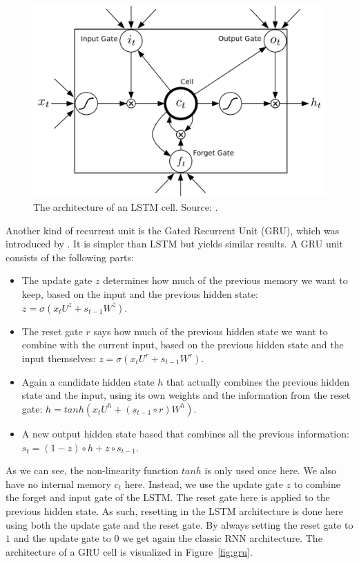 \begin{figure}[htb]
    \centering
    \includegraphics[width=\linewidth]{images/lstm.png}
    \caption[Long short-term memory cell]{The architecture of an LSTM cell. Source: \cite{journals/corr/Graves13}.}
    \label{fig:lstm}
\end{figure}
Another kind of recurrent unit is the Gated Recurrent Unit (GRU), which was introduced by \cite{Cho2014LearningTranslation}. It is simpler than LSTM but yields similar results. A GRU unit consists of the following parts:
\begin{itemize}
\item The update gate $z$ determines how much of the previous memory we want to keep, based on the input and the previous hidden state: $z = \sigma (x_tU^z + s_{t-1}W^z)$.
\item The reset gate $r$ says how much of the previous hidden state we want to combine with the current input, based on the previous hidden state and the input themselves: $z = \sigma (x_tU^r + s_{t-1}W^r)$.
\item Again a candidate hidden state $h$ that actually combines the previous hidden state and the input, using its own weights and the information from the reset gate: $h = tanh(x_tU^h + (s_{t-1} \circ r)W^h)$.
\item A new output hidden state based that combines all the previous information: $s_t = (1-z) \circ h + z \circ s_{t-1}$.
\end{itemize}
As we can see, the non-linearity function $tanh$ is only used once here. We also have no internal memory $c_t$ here. Instead, we use the update gate $z$ to combine the forget and input gate of the LSTM. The reset gate here is applied to the previous hidden state. As such, resetting in the LSTM architecture is done here using both the update gate and the reset gate. By always setting the reset gate to $1$ and the update gate to $0$ we get again the classic RNN architecture. The architecture of a GRU cell is visualized in Figure~\ref{fig:gru}.\\
